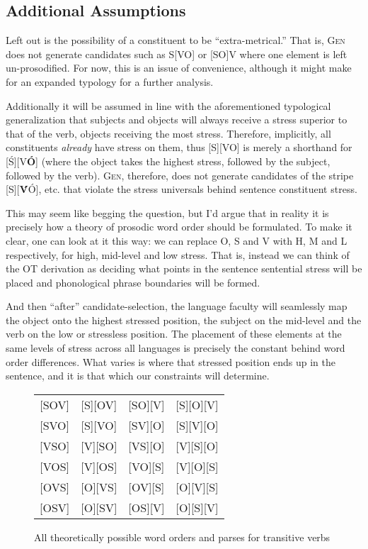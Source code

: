 \documentclass{article}
\begin{document}
\subsection{Additional Assumptions\label{assump}}

Left out is the possibility of a constituent to be ``extra-metrical.''
That is, \textsc{Gen} does not generate candidates such as S[VO] or [SO]V where one element is left un-prosodified.
For now, this is an issue of convenience, although it might make for an expanded typology for a further analysis.

Additionally it will be assumed in line with the aforementioned typological generalization that subjects and objects will always receive a stress superior to that of the verb, objects receiving the most stress.
Therefore, implicitly, all constituents \emph{already} have stress on them, thus [S][VO] is merely a shorthand for [{\'S}][V\textbf{\'O}] (where the object takes the highest stress, followed by the subject, followed by the verb).
\textsc{Gen}, therefore, does not generate candidates of the stripe [S][\textbf{\'V}\'O], etc. that violate the stress universals behind sentence constituent stress.

This may seem like begging the question, but I'd argue that in reality it is precisely how a theory of prosodic word order should be formulated.
To make it clear, one can look at it this way: we can replace O, S and V with H, M and L respectively, for high, mid-level and low stress.
That is, instead we can think of the OT derivation as deciding what points in the sentence sentential stress will be placed and phonological phrase boundaries will be formed.

And then ``after'' candidate-selection, the language faculty will seamlessly map the object onto the highest stressed position, the subject on the mid-level and the verb on the low or stressless position.
The placement of these elements at the same levels of stress across all languages is precisely the constant behind word order differences.
What varies is where that stressed position ends up in the sentence, and it is that which our constraints will determine.

\begin{figure}
	\begin{center}
	\begin{tabular}{cccc}
		{}[SOV]&[S][OV]&[SO][V]&[S][O][V]\\
		{}[SVO]&[S][VO]&[SV][O]&[S][V][O]\\
		{}[VSO]&[V][SO]&[VS][O]&[V][S][O]\\
		{}[VOS]&[V][OS]&[VO][S]&[V][O][S]\\
		{}[OVS]&[O][VS]&[OV][S]&[O][V][S]\\
		{}[OSV]&[O][SV]&[OS][V]&[O][S][V]\\
	\end{tabular}
	\end{center}
	\caption{All theoretically possible word orders and parses for transitive verbs\label{allcand}}
\end{figure}
\end{document}
